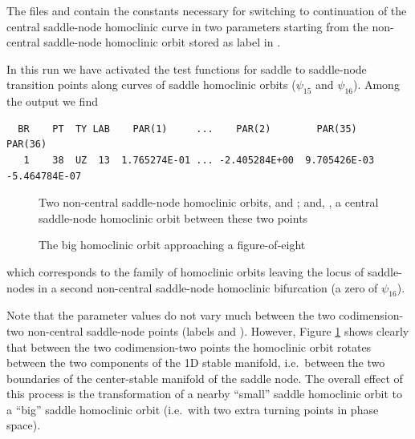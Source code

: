 \documentclass[12pt]{report}
\begin{document}
The files  and  contain the constants necessary 
for switching to continuation of the central saddle-node homoclinic curve 
in two parameters starting from the non-central saddle-node homoclinic orbit
stored as label  in .
\begin{center}
\end{center}
In this run we have activated the test functions for saddle to saddle-node
transition points along curves of saddle homoclinic orbits ($\psi_{15}$ and 
$\psi_{16}$). Among the output we find
\begin{verbatim}
  BR    PT  TY LAB    PAR(1)     ...    PAR(2)        PAR(35)       PAR(36)    
   1    38  UZ  13  1.765274E-01 ... -2.405284E+00  9.705426E-03 -5.464784E-07
\end{verbatim}
\begin{figure}[p]
\epsfysize 9.0cm
\centerline{}
\caption{Two non-central saddle-node homoclinic orbits,  and ;
and, , a central saddle-node homoclinic orbit between
these two points \label{kf.7}}
\end{figure}
\begin{figure}[p]
\epsfysize 9.0cm
\centerline{}
\caption{The big homoclinic orbit approaching a figure-of-eight}
\label{kp.8}
\end{figure}
%
which corresponds to the family of homoclinic orbits leaving
the locus of saddle-nodes in a second non-central saddle-node
homoclinic bifurcation (a zero of $\psi_{16}$). 

Note that the parameter values do not vary much between the
two codimension-two non-central saddle-node points (labels  and ).
However, Figure \ref{kf.7} shows clearly that between the two
codimension-two points 
the homoclinic orbit
rotates between the two components of the 1D stable manifold, i.e.\
between the two boundaries of the center-stable manifold of the saddle
node. The overall effect of this process is the transformation of a
nearby ``small'' saddle homoclinic orbit to a ``big'' saddle
homoclinic orbit (i.e.\ with two extra turning points in phase space).  
\end{document}

